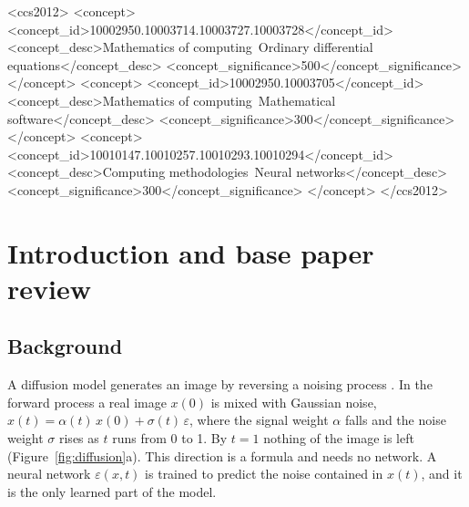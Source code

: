 \documentclass[sigconf]{acmart}
\newcommand{\eps}{\varepsilon}
\begin{document}
\begin{CCSXML}
<ccs2012>
 <concept>
  <concept_id>10002950.10003714.10003727.10003728</concept_id>
  <concept_desc>Mathematics of computing~Ordinary differential equations</concept_desc>
  <concept_significance>500</concept_significance>
 </concept>
 <concept>
  <concept_id>10002950.10003705</concept_id>
  <concept_desc>Mathematics of computing~Mathematical software</concept_desc>
  <concept_significance>300</concept_significance>
 </concept>
 <concept>
  <concept_id>10010147.10010257.10010293.10010294</concept_id>
  <concept_desc>Computing methodologies~Neural networks</concept_desc>
  <concept_significance>300</concept_significance>
 </concept>
</ccs2012>
\end{CCSXML}


\maketitle

\section{Introduction and base paper review}

\subsection{Background}

A diffusion model generates an image by reversing a noising process
\cite{ho2020ddpm,song2021sde}. In the forward process a real image $x(0)$ is
mixed with Gaussian noise, $x(t)=\alpha(t)\,x(0)+\sigma(t)\,\eps$, where the
signal weight $\alpha$ falls and the noise weight $\sigma$ rises as $t$ runs from
0 to 1. By $t=1$ nothing of the image is left (Figure~\ref{fig:diffusion}a). This
direction is a formula and needs no network. A neural network $\eps(x,t)$ is
trained to predict the noise contained in $x(t)$, and it is the only learned part
of the model.
\end{document}
